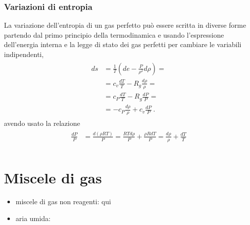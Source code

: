 \documentclass[letterpaper,10pt,italian]{jupyterBook}
\begin{document}
\subsubsection{Variazioni di entropia}
\label{\detokenize{ch/thermodynamics/ideal-gas-formulas:variazioni-di-entropia}}
\sphinxAtStartPar
La variazione dell’entropia di un gas perfetto può essere scritta in diverse forme partendo dal primo principio della termodinamica e usando l’espressione dell’energia interna e la legge di stato dei gas perfetti per cambiare le variabili indipendenti,
\begin{equation*}
\begin{split}\begin{aligned}
  ds & = \frac{1}{T} \left( d e - \frac{P}{\rho^2} d \rho \right) = \\
     & = c_v \frac{dT}{T} - R_g \frac{d \rho}{\rho} = \\
     & = c_P \frac{dT}{T} - R_g \frac{d P}{P} = \\
     & = -c_P \frac{d \rho}{\rho} + c_v \frac{d P}{P}  \ .
\end{aligned}\end{split}
\end{equation*}
\sphinxAtStartPar
avendo usato la relazione
\begin{equation*}
\begin{split}\begin{aligned}
  \frac{d P}{P} & = \frac{d (\rho R T)}{P} = \frac{R T d \rho}{P} + \frac{\rho R d T}{P} = \frac{d \rho }{\rho} + \frac{d T}{T} \\
\end{aligned}\end{split}
\end{equation*}
\sphinxstepscope


\section{Miscele di gas}
\label{\detokenize{ch/thermodynamics/gas-mixture:miscele-di-gas}}\label{\detokenize{ch/thermodynamics/gas-mixture:physics-hs-thermodynamics-matter-gases-mixture}}\label{\detokenize{ch/thermodynamics/gas-mixture::doc}}\begin{itemize}
\item {} 
\sphinxAtStartPar
miscele di gas non reagenti: qui

\item {} 
\sphinxAtStartPar
aria umida: 

\end{itemize}
\end{document}

